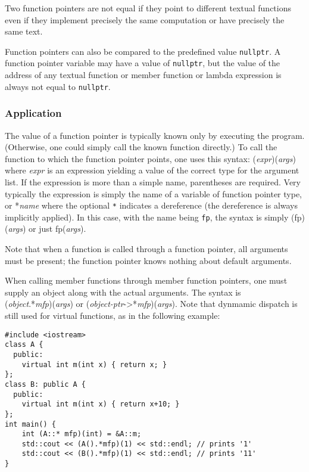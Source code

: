 Two function pointers are not equal if they point to 
different textual functions even if they implement precisely the
same computation or have precisely the same text.

Function pointers can also be compared to the predefined value \lstinline|nullptr|. A function pointer variable may have
a value of \lstinline|nullptr|, but the value of the address
of any textual function or member function or lambda expression
 is always not
equal to \lstinline|nullptr|.

\subsubsection{Application}

The value of a function pointer is typically known only by
executing the program. (Otherwise, one could simply call the
known function directly.) To call the function to which the
function pointer points, one uses this syntax:
(\emph{expr})(\emph{args}) where \emph{expr} is an expression yielding a value of the correct type for the argument list. If the expression is
more than a simple name, parentheses are required.
Very typically the expression is simply the name of a variable of function pointer type, or *\emph{name} where the optional \lstinline|*| indicates a dereference (the dereference is always implicitly applied).
In this case, with the name being \lstinline|fp|, the syntax is simply (fp)(\emph{args}) or just
fp(\emph{args}).

Note that when a function is called through a function pointer, all arguments must be present; the function pointer knows nothing about
default arguments.

When calling member functions through member function pointers, one must supply an object along with the actual arguments. The syntax is \\
(\emph{object}.*\emph{mfp})(\emph{args}) or
(\emph{object-ptr}->*\emph{mfp})(\emph{args}).
Note that dynmamic dispatch is still used for virtual functions, as in the following example:
\begin{lstlisting}
#include <iostream>
class A {
  public:
    virtual int m(int x) { return x; }
};
class B: public A {
  public:
    virtual int m(int x) { return x+10; }
};
int main() {
    int (A::* mfp)(int) = &A::m;
    std::cout << (A().*mfp)(1) << std::endl; // prints '1'
    std::cout << (B().*mfp)(1) << std::endl; // prints '11'
}
\end{lstlisting} 
 
